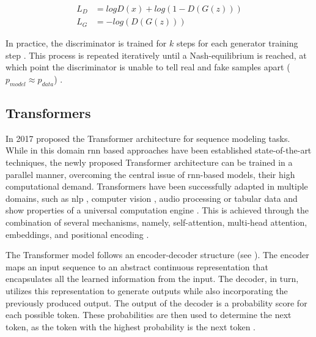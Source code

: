 \begin{equation}
  \begin{align}
  \label{eqn:gan-loss}
  L_D&=logD(x)+log(1-D(G(z)))\\
  L_G&=-log(D(G(z)))
\end{align}
\end{equation}


In practice, the discriminator is trained for $k$ steps for each generator training step \cite{aggarwal2018NeuralNetworksDeep}.
This process is repeated iteratively until a Nash-equilibrium is reached, at which point the discriminator is unable to tell real and fake samples apart ($p_{model}\approx p_{data}$) \cite{NIPS2014_5ca3e9b1, aggarwal2018NeuralNetworksDeep}.

\subsection{Transformers}
\label{ch:preliminaries-transformers}

In 2017 \textcite{vaswani2017AttentionAllYou} proposed the Transformer architecture for sequence modeling tasks.
While in this domain \gls{rnn} based approaches have been established state-of-the-art techniques, the newly proposed Transformer architecture can be trained in a parallel manner,
overcoming the central issue of \gls{rnn}-based models, their high computational demand.
Transformers have been successfully adapted in multiple domains, such as \gls{nlp} \cite{gillioz2020OverviewTransformerbasedModels}, computer vision \cite{khan2022TransformersVisionSurvey}, audio processing \cite{gong2022SSASTSelfSupervisedAudio} or 
tabular data \cite{huang2020TabTransformerTabularData} and show properties of a universal computation engine \cite{lu2021PretrainedTransformersUniversal, lin2022SurveyTransformers}.
This is achieved through the combination of several mechanisms, namely, self-attention, multi-head attention, embeddings, and positional encoding \cite{vaswani2017AttentionAllYou}.

The Transformer \gls{model} follows an encoder-decoder structure (see ).
The encoder maps an input sequence to an abstract continuous representation that encapsulates all the learned information from the input.
The decoder, in turn, utilizes this representation to generate outputs while also incorporating the previously produced output.
The output of the decoder is a probability score for each possible token.
These probabilities are then used to determine the next token, as the token with the highest probability is the next token \cite{vaswani2017AttentionAllYou}. 

